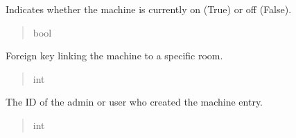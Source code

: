 \documentclass[letterpaper,10pt,english]{sphinxmanual}
\begin{document}
\begin{fulllineitems}
\begin{fulllineitems}
\label{\detokenize{app.mysql:app.mysql.machine.Machine.on}}
\pysigstartsignatures
\pysigline
{}
\pysigstopsignatures
\sphinxAtStartPar
Indicates whether the machine is currently on (True) or off (False).
\begin{quote}\begin{description}
\sphinxAtStartPar
bool

\end{description}\end{quote}

\end{fulllineitems}


\begin{fulllineitems}
\label{\detokenize{app.mysql:app.mysql.machine.Machine.idRoom}}
\pysigstartsignatures
\pysigline
{}
\pysigstopsignatures
\sphinxAtStartPar
Foreign key linking the machine to a specific room.
\begin{quote}\begin{description}
\sphinxAtStartPar
int

\end{description}\end{quote}

\end{fulllineitems}


\begin{fulllineitems}
\label{\detokenize{app.mysql:app.mysql.machine.Machine.createdBy}}
\pysigstartsignatures
\pysigline
{}
\pysigstopsignatures
\sphinxAtStartPar
The ID of the admin or user who created the machine entry.
\begin{quote}\begin{description}
\sphinxAtStartPar
int

\end{description}\end{quote}

\end{fulllineitems}


\end{fulllineitems}
\end{document}

